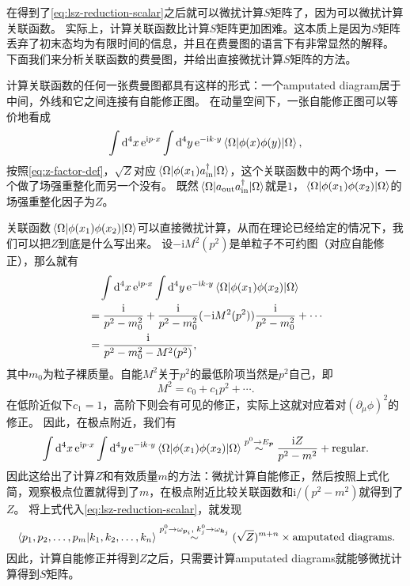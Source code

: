\documentclass[hyperref, UTF8, a4paper]{ctexart}
\newcommand*{\ii}{\mathrm{i}}
\newcommand*{\ee}{\mathrm{e}}
\begin{document}
在得到了\eqref{eq:lsz-reduction-scalar}之后就可以微扰计算$S$矩阵了，因为可以微扰计算关联函数。
实际上，计算关联函数比计算$S$矩阵更加困难。这本质上是因为$S$矩阵丢弃了初末态均为有限时间的信息，并且在费曼图的语言下有非常显然的解释。
下面我们来分析关联函数的费曼图，并给出直接微扰计算$S$矩阵的方法。

计算关联函数的任何一张费曼图都具有这样的形式：一个amputated diagram居于中间，外线和它之间连接有自能修正图。
在动量空间下，一张自能修正图可以等价地看成
\[
    \int \dd[4]{x} \ee^{\ii p \cdot x} \int \dd[4]{y} \ee^{- \ii k \cdot y} \mel{\Omega}{\phi(x) \phi(y)}{\Omega},
\]
按照\eqref{eq:z-factor-def}，$\sqrt{Z}$对应$\mel{\Omega}{\phi(x_1) a^\dagger_\text{in}}{\Omega}$，这个关联函数中的两个场中，一个做了场强重整化而另一个没有。
既然$\mel{\Omega}{a_\text{out} a^\dagger_\text{in}}{\Omega}$就是$1$，$\mel{\Omega}{\phi(x_1) \phi(x_2)}{\Omega}$的场强重整化因子为$Z$。

关联函数$\mel{\Omega}{\phi(x_1) \phi(x_2)}{\Omega}$可以直接微扰计算，从而在理论已经给定的情况下，我们可以把$Z$到底是什么写出来。
设$- \ii M^2(p^2)$是单粒子不可约图（对应自能修正），那么就有
\[
    \begin{aligned}
        &\quad \int \dd[4]{x} \ee^{\ii p \cdot x} \int \dd[4]{y} \ee^{- \ii k \cdot y} \mel{\Omega}{\phi(x_1) \phi(x_2)}{\Omega} \\
        &= \frac{\ii}{p^2 - m_0^2} + \frac{\ii}{p^2 - m_0^2} (- \ii M^2(p^2)) \frac{\ii}{p^2 - m_0^2} + \cdots \\
        &= \frac{\ii}{p^2 - m_0^2 - M^2(p^2)},
    \end{aligned}
\]
其中$m_0$为粒子裸质量。自能$M^2$关于$p^2$的最低阶项当然是$p^2$自己，即
\[
    M^2 = c_0 + c_1 p^2 + \cdots.
\]
在低阶近似下$c_1=1$，高阶下则会有可见的修正，实际上这就对应着对$(\partial_\mu \phi)^2$的修正。
因此，在极点附近，我们有
\begin{equation}
    \int \dd[4]{x} \ee^{\ii p \cdot x} \int \dd[4]{y} \ee^{- \ii k \cdot y} \mel{\Omega}{\phi(x_1) \phi(x_2)}{\Omega} \stackrel{p^0 \to E_{\vb*{p}}}{\sim} \frac{\ii Z}{p^2 - m^2} + \text{regular}. 
\end{equation}
因此这给出了计算$Z$和有效质量$m$的方法：微扰计算自能修正，然后按照上式化简，观察极点位置就得到了$m$，在极点附近比较关联函数和$\ii / (p^2 - m^2)$就得到了$Z$。
将上式代入\eqref{eq:lsz-reduction-scalar}，就发现
\begin{equation}
    \braket*{p_1, p_2, \ldots, p_m}{k_1, k_2, \ldots, k_n} \stackrel{p_i^0 \to \omega_{\vb*{p}_i}, \; k_j^0 \to \omega_{\vb*{k}_j}}{\sim} (\sqrt{Z})^{m+n} \times \text{amputated diagrams}.
\end{equation}
因此，计算自能修正并得到$Z$之后，只需要计算amputated diagrams就能够微扰计算得到$S$矩阵。
\end{document}
